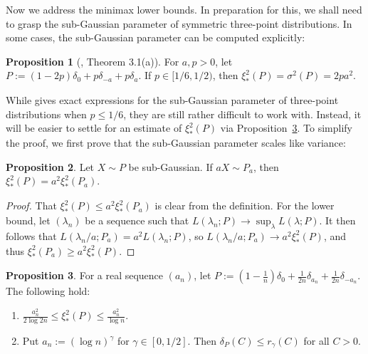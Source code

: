 \documentclass{article}
\theoremstyle{definition}
\newtheorem{proposition}{Proposition}
\newcommand{\1}{\mathbbm{1}}
\begin{document}
Now we address the minimax lower bounds. In preparation for this, we shall need to grasp the sub-Gaussian parameter of symmetric three-point distributions. In some cases, the sub-Gaussian parameter can be computed explicitly: 
\begin{proposition}[\cite{atouani2025optimalsubgaussianvarianceproxy}, Theorem 3.1(a)]
\label{prop:3-point-sub-gauss}
    For $a, p > 0$, let $P := (1 - 2p)\delta_0 + p\delta_{-a} + p\delta_a$. If $p \in [1/6, 1/2)$, then $\xi_*^2(P) = \sigma^2(P) = 2pa^2$.
\end{proposition}
While \cite{atouani2025optimalsubgaussianvarianceproxy} gives exact expressions for the sub-Gaussian parameter of three-point distributions when $p \leq 1/6$, they are still rather difficult to work with. Instead, it will be easier to settle for an estimate of $\xi_*^2(P)$ via Proposition~\ref{prop:three-point-computation}. To simplify the proof, we first prove that the sub-Gaussian parameter scales like variance: 
\begin{proposition}
\label{prop:subgauss-scaling}
    Let $X \sim P$ be sub-Gaussian. If $aX \sim P_a$, then $\xi_*^2(P) = a^2\xi_*^2(P_a)$.
\end{proposition}
\begin{proof}
    That $\xi_*^2(P) \leq a^2\xi_*^2(P_a)$ is clear from the definition. For the lower bound, let $(\lambda_n)$ be a sequence such that  $L(\lambda_n; P) \to \sup_\lambda L(\lambda; P)$. It then follows that $L(\lambda_n/a; P_a) = a^2L(\lambda_n; P)$, so $ L(\lambda_n/a; P_a) \to a^2\xi_*^2(P)$, and thus $\xi_*^2(P_a) \geq a^2 \xi_*^2(P)$.
\end{proof}
\begin{proposition}
    
\label{prop:three-point-computation}
    For a real sequence $(a_n)$, let $P := (1 - \frac1n)\delta_0 + \frac{1}{2n}\delta_{a_n} + \frac{1}{2n} \delta_{-a_n}$. The following hold:
    \begin{enumerate}
        \item[(a)] $\frac{a_n^2}{2\log 2n} \leq \xi_*^2(P) \leq \frac{a_n^2}{\log n}$. 
        \item[(b)] Put $a_n := (\log n)^\gamma$ for $\gamma \in [0, 1/2]$. Then $\delta_P(C) \leq  r_\gamma(C)$ for all $C > 0$.
    \end{enumerate}
\end{proposition}
\end{document}
